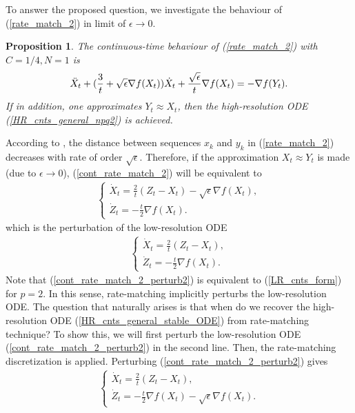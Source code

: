 \documentclass{article}
\theoremstyle{plain}
\newtheorem{prop}{\textbf{Proposition}}
\theoremstyle{definition}
\theoremstyle{remark}
\begin{document}
To answer the proposed question, we investigate the behaviour of (\ref{rate_match_2}) in limit of $\epsilon \rightarrow 0$.
\begin{prop}\label{prop1}
The continuous-time behaviour of (\ref{rate_match_2}) with $C=1/4,N=1$ is
\begin{align}\label{cont_rate_match_2}
    \Ddot{X}_t+(\frac{3}{t}+\sqrt{\epsilon}\nabla f(X_t))\dot X_t+\frac{\sqrt{\epsilon}}{t}\nabla f(X_t)=-\nabla f(Y_t).
\end{align}
If in addition, one approximates $Y_t\approx X_t$, then the high-resolution ODE (\ref{HR_cnts_general_npq2}) is achieved.
\end{prop}
According to \cite{WibisonoE7351}, the distance between sequences $x_k$ and $y_k$ in (\ref{rate_match_2}) decreases with rate of order $\sqrt{\epsilon}$. Therefore, if the approximation $X_t\approx Y_t$ is made (due to $\epsilon\rightarrow 0$), (\ref{cont_rate_match_2}) will be equivalent to
\begin{align}\label{cont_rate_match_2_perturb}
    \left\{\begin{array}{l}
         \dot X_t = \frac{2}{t}(Z_t-X_t)-\sqrt{\epsilon}\nabla f(X_t),  \\
          \dot Z_t = -\frac{t}{2}\nabla f(X_t).
    \end{array}
    \right.
\end{align}
which is the perturbation of the low-resolution ODE
\begin{align}\label{cont_rate_match_2_perturb2}
    \left\{\begin{array}{l}
         \dot X_t = \frac{2}{t}(Z_t-X_t),  \\
          \dot Z_t = -\frac{t}{2}\nabla f(X_t).
    \end{array}
    \right.
\end{align}
Note that (\ref{cont_rate_match_2_perturb2}) is equivalent to (\ref{LR_cnts_form}) for $p=2$. In this sense, rate-matching implicitly perturbs the low-resolution ODE. The question that naturally arises is that when do we recover the high-resolution ODE (\ref{HR_cnts_general_stable_ODE}) from rate-matching technique? To show this, we will first perturb the low-resolution ODE (\ref{cont_rate_match_2_perturb2}) in the second line. Then, the rate-matching discretization is applied. Perturbing (\ref{cont_rate_match_2_perturb2}) gives
\begin{align}\label{cont_rate_match_2_perturb3}
    \left\{\begin{array}{l}
         \dot X_t = \frac{2}{t}(Z_t-X_t),  \\
          \dot Z_t = -\frac{t}{2}\nabla f(X_t)-\sqrt{\epsilon}\nabla f(X_t).
    \end{array}
    \right.
\end{align}
\end{document}
